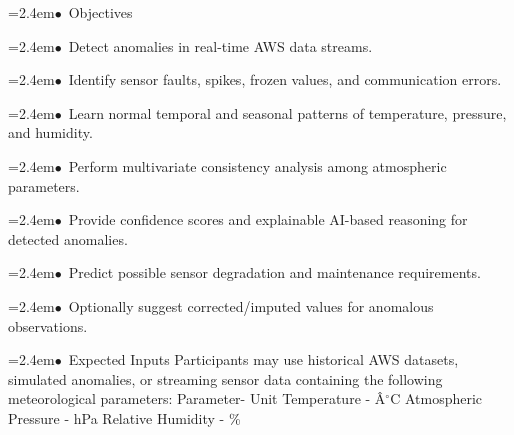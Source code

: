 \documentclass[10pt,a4paper]{article}
\begin{document}
\begin{tcolorbox}[pscard, title={"\textbf{SIH26073} \quad $\vert$ \quad AI/ML-Based Intelligent Anomaly Detection for Automatic Weather Stations (A...}]
\noindent\hspace*{1.2em}\hangindent=2.4em\textcolor{sihblue}{$\bullet$}~\small Objectives\par\vspace{0.05cm}
\noindent\hspace*{1.2em}\hangindent=2.4em\textcolor{sihblue}{$\bullet$}~\small Detect anomalies in real-time AWS data streams.\par\vspace{0.05cm}
\noindent\hspace*{1.2em}\hangindent=2.4em\textcolor{sihblue}{$\bullet$}~\small Identify sensor faults, spikes, frozen values, and communication errors.\par\vspace{0.05cm}
\noindent\hspace*{1.2em}\hangindent=2.4em\textcolor{sihblue}{$\bullet$}~\small Learn normal temporal and seasonal patterns of temperature, pressure, and humidity.\par\vspace{0.05cm}
\noindent\hspace*{1.2em}\hangindent=2.4em\textcolor{sihblue}{$\bullet$}~\small Perform multivariate consistency analysis among atmospheric parameters.\par\vspace{0.05cm}
\noindent\hspace*{1.2em}\hangindent=2.4em\textcolor{sihblue}{$\bullet$}~\small Provide confidence scores and explainable AI-based reasoning for detected anomalies.\par\vspace{0.05cm}
\noindent\hspace*{1.2em}\hangindent=2.4em\textcolor{sihblue}{$\bullet$}~\small Predict possible sensor degradation and maintenance requirements.\par\vspace{0.05cm}
\noindent\hspace*{1.2em}\hangindent=2.4em\textcolor{sihblue}{$\bullet$}~\small Optionally suggest corrected/imputed values for anomalous observations.\par\vspace{0.05cm}
\noindent\hspace*{1.2em}\hangindent=2.4em\textcolor{sihblue}{$\bullet$}~\small Expected Inputs Participants may use historical AWS datasets, simulated anomalies, or streaming sensor data containing the following meteorological parameters: Parameter- Unit Temperature - Â$^\circ$C Atmospheric Pressure - hPa Relative Humidity - \%\par\vspace{0.05cm}

\end{tcolorbox}
\end{document}
